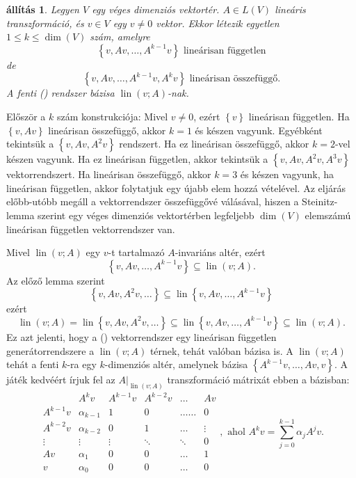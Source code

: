 \documentclass[9pt, a4paper, showtrims]{memoir}
\makeatletter
\renewenvironment{proof}[1][\proofname]
    {\par\pushQED{\qed}%
    \normalfont \topsep6\p@\@plus6\p@\relax
    \trivlist
    \item[\hskip\labelsep
        \itshape
    #1\@addpunct{:}]\ignorespaces}
    {\popQED\endtrivlist\@endpefalse}
\theoremstyle{plain}
\newtheorem{proposition}{állítás}[chapter]
\theoremstyle{remark}
\theoremstyle{definition}
\DeclareMathOperator{\lin}{lin}
\makeatother
\begin{document}
\begin{proposition}
	Legyen $V$ egy véges dimenziós vektortér.
	$A\in L\left( V \right)$ lineáris transzformáció,
	és $v\in V$ egy $v\neq 0$ vektor.
	Ekkor létezik egyetlen $1\leq k\leq \dim(V)$ szám,
	amelyre
	\[
		\left\{ v,Av,\ldots,A^{k-1}v \right\} \text{ lineárisan független}\tag{\dag}
	\]
	de
	\[
		\left\{ v,Av,\ldots,A^{k-1}v, A^kv \right\} \text{ lineárisan összefüggő.}\tag{\ddag}
	\]
	A fenti (\dag) rendszer bázisa $\lin\left( v;A \right)$-nak.
\end{proposition}
\begin{proof}
	Először a $k$ szám konstrukciója:
	Mivel $v\neq 0$, ezért $\left\{ v \right\}$ lineárisan független.
	Ha $\left\{ v,Av \right\}$ lineárisan összefüggő,
	akkor $k=1$ és készen vagyunk.
	Egyébként tekintsük a $\left\{ v,Av,A^2v \right\}$ rendszert.
	Ha ez lineárisan összefüggő, akkor $k=2$-vel készen vagyunk.
	Ha ez lineárisan független, akkor tekintsük a
	$\left\{ v,Av,A^2v,A^3v \right\}$ vektorrendszert.
	Ha lineárisan összefüggő, akkor $k=3$ és készen vagyunk,
	ha lineárisan független, akkor folytatjuk egy újabb elem hozzá vételével.
	Az eljárás előbb-utóbb megáll a vektorrendszer összefüggővé válásával,
	hiszen a Steinitz-lemma  szerint egy véges dimenziós vektortérben legfeljebb
	$\dim(V)$ elemszámú lineárisan független vektorrendszer van.

	Mivel $\lin\left( v;A \right)$ egy $v$-t tartalmazó $A$-invariáns altér,
	ezért
	\[
		\left\{ v,Av,\ldots,A^{k-1}v \right\}
		\subseteq
		\lin\left( v;A \right).
	\]
	Az előző lemma szerint
	\[
		\left\{ v,Av,A^2v,\dots \right\}
		\subseteq
		\lin\left\{ v,Av,\ldots,A^{k-1}v \right\}
	\]
	ezért
	\[
		\lin\left( v;A \right)
		=
		\lin\left\{ v,Av,A^2v,\dots \right\}
		\subseteq
		\lin\left\{ v,Av,\ldots,A^{k-1}v \right\}
		\subseteq
		\lin\left( v;A \right).
	\]
	Ez azt jelenti, hogy a (\dag) vektorrendszer egy lineárisan független generátorrendszere
	a $\lin\left( v;A \right)$ térnek, tehát valóban bázisa is.
\end{proof}
A $\lin\left( v;A \right)$ tehát a fenti $k$-ra egy $k$-dimenziós altér,
amelynek bázisa $\left\{A^{k-1}v,\ldots,Av,v \right\}$.
A játék kedvéért írjuk fel az $A|_{\lin\left( v;A \right)}$ transzformáció mátrixát
ebben a bázisban:\label{ar:elsomegjelenes}
\[
	\begin{array}{r|ccccc}
		         & A^kv         & A^{k-1}v & A^{k-2}v & \dots      & Av     \\
		\hline
		A^{k-1}v & \alpha_{k-1} & 1        & 0        & \dots\dots & 0      \\
		A^{k-2}v & \alpha_{k-2} & 0        & 1        & \dots      & \vdots \\
		\vdots   & \vdots       & \vdots   & \ddots   & \ddots     & 0      \\
		Av       & \alpha_1     & 0        & 0        & \dots      & 1      \\
		v        & \alpha_0     & 0        & 0        & \dots      & 0
	\end{array},
	\text{ ahol }A^kv=\sum_{j=0}^{k-1}\alpha_jA^jv.
\]
\end{document}
